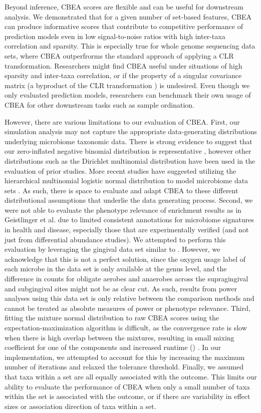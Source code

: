 \documentclass[10pt,letterpaper]{article}
\begin{document}
Beyond inference, CBEA scores are flexible and can be useful for downstream analysis. We demonstrated that for a given number of set-based features, CBEA can produce informative scores that contribute to competitive performance of prediction models even in low signal-to-noise ratios with high inter-taxa correlation and sparsity. This is especially true for whole genome sequencing data sets, where CBEA outperfrorms the standard approach of applying a CLR transformation. Researchers might find CBEA useful under situations of high sparsity and inter-taxa correlation, or if the property of a singular covariance matrix (a byproduct of the CLR transformation \cite{gloor2017}) is undesired. Even though we only evaluated prediction models, researchers can benchmark their own usage of CBEA for other downstream tasks such as sample ordination. 

However, there are various limitations to our evaluation of CBEA. First, our simulation analysis may not capture the appropriate data-generating distributions underlying microbiome taxonomic data. There is strong evidence to suggest that our zero-inflated negative binomial distribution is representative \cite{calgaro2020}, however other distributions such as the Dirichlet multinomial distribution \cite{wu2016a} have been used in the evaluation of prior studies. More recent studies have suggested utilizing the hierarchical multinomial logistic normal distribution to model microbiome data sets \cite{morton2021, ma2021a}. As such, there is space to evaluate and adapt CBEA to these different distributional assumptions that underlie the data generating process. Second, we were not able to evaluate the phenotype relevance of enrichment results as in Geistlinger et al. \cite{geistlinger2021} due to limited consistent annotations for microbiome signatures in health and disease, especially those that are experimentally verified (and not just from differential abundance studies). We attempted to perform this evaluation by leveraging the gingival data set similar to \cite{calgaro2020}. However, we acknowledge that this is not a perfect solution, since the oxygen usage label of each microbe in the data set is only available at the genus level, and the difference in counts for obligate aerobes and anaerobes across the supragingival and subgingival sites might not be as clear cut. As such, results from power analyses using this data set is only relative between the comparison methods and cannot be treated as absolute measures of power or phenotype relevance. Third, fitting the mixture normal distribution to raw CBEA scores using the expectation-maximization algorithm is difficult, as the convergence rate is slow when there is high overlap between the mixtures, resulting in small mixing coefficient for one of the components and increased runtime () \cite{naim2012}. In our implementation, we attempted to account for this by increasing the maximum number of iterations and relaxed the tolerance threshold. Finally, we assumed that taxa within a set are all equally associated with the outcome. This limits our ability to evaluate the performance of CBEA when only a small number of taxa within the set is associated with the outcome, or if there are variability in effect sizes or association direction of taxa within a set. 
\end{document}

